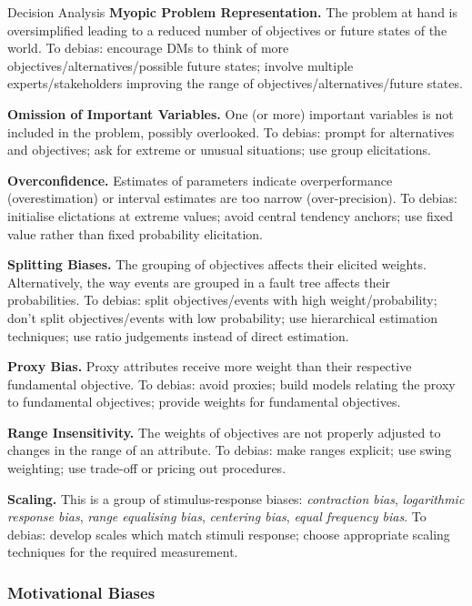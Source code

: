 \begin{chapter}{Decision Analysis \label{Ch:decision}}
\noindent\textbf{Myopic Problem Representation.} The problem at hand is oversimplified leading to a reduced number of objectives or future states of the world. To debias: encourage DMs to think of more objectives/alternatives/possible future states; involve multiple experts/stakeholders improving the range of objectives/alternatives/future states.

\noindent\textbf{Omission of Important Variables.} One (or more) important variables is not included in the problem, possibly overlooked. To debias: prompt for alternatives and objectives; ask for extreme or unusual situations; use group elicitations.

\noindent\textbf{Overconfidence.} Estimates of parameters indicate overperformance (overestimation) or interval estimates are too narrow (over-precision). To debias: initialise elictations at extreme values; avoid central tendency anchors; use fixed value rather than fixed probability elicitation.

\noindent\textbf{Splitting Biases.} The grouping of objectives affects their elicited weights. Alternatively, the way events are grouped in a fault tree affects their probabilities. To debias: split objectives/events with high weight/probability; don't split objectives/events with low probability; use hierarchical estimation techniques; use ratio judgements instead of direct estimation.

\noindent\textbf{Proxy Bias.} Proxy attributes receive more weight than their respective fundamental objective. To debias: avoid proxies; build models relating the proxy to fundamental objectives; provide weights for fundamental objectives.

\noindent\textbf{Range Insensitivity.} The weights of objectives are not properly adjusted to changes in the range of an attribute. To debias: make ranges explicit; use swing weighting; use trade-off or pricing out procedures.

\noindent\textbf{Scaling.} This is a group of stimulus-response biases: \textit{contraction bias}, \textit{logarithmic response bias}, \textit{range equalising bias}, \textit{centering bias}, \textit{equal frequency bias}. To debias: develop scales which match stimuli response; choose appropriate scaling techniques for the required measurement.

\subsubsection{Motivational Biases}


\end{chapter}
